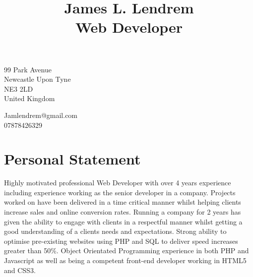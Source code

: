 \documentclass[10pt]{article}
\title{\bfseries\Huge James L. Lendrem\\Web Developer}
\date{}
\begin{document}
\maketitle

\begin{minipage}[t]{0.48\textwidth}
99 Park Avenue\\
Newcastle Upon Tyne\\
NE3 2LD\\
United Kingdom
\end{minipage}
\begin{minipage}[t]{0.48\textwidth}
\begin{flushright}
Jamlendrem@gmail.com\\
07878426329
\end{flushright}
\end{minipage}

\newcommand\VRule{\color{lightgray}\vrule width 0.5pt}

\section*{Personal Statement}
Highly motivated professional Web Developer with over 4 years experience including experience working as the senior developer in a company. Projects worked on have been delivered in a time critical manner whilst helping clients increase sales and online conversion rates. Running a company for 2 years has given the ability to engage with clients in a respectful manner whilst getting a good understanding of a clients needs and expectations. Strong ability to optimise pre-existing websites using PHP and SQL to deliver speed increases greater than 50\%. Object Orientated Programming experience in both PHP and Javascript as well as being a competent front-end developer working in HTML5 and CSS3.
\end{document}
